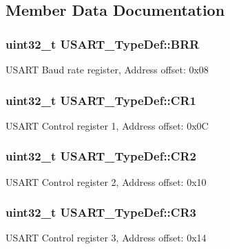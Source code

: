 \subsection{Member Data Documentation}
\subsubsection[{\texorpdfstring{B\+RR}{BRR}}]{ uint32\+\_\+t U\+S\+A\+R\+T\+\_\+\+Type\+Def\+::\+B\+RR}\hypertarget{struct_u_s_a_r_t___type_def_a6ef06ba9d8dc2dc2a0855766369fa7c9}{}\label{struct_u_s_a_r_t___type_def_a6ef06ba9d8dc2dc2a0855766369fa7c9}
U\+S\+A\+RT Baud rate register, Address offset\+: 0x08 
\subsubsection[{\texorpdfstring{C\+R1}{CR1}}]{ uint32\+\_\+t U\+S\+A\+R\+T\+\_\+\+Type\+Def\+::\+C\+R1}\hypertarget{struct_u_s_a_r_t___type_def_a6d7dcd3972a162627bc3470cbf992ec4}{}\label{struct_u_s_a_r_t___type_def_a6d7dcd3972a162627bc3470cbf992ec4}
U\+S\+A\+RT Control register 1, Address offset\+: 0x0C 
\subsubsection[{\texorpdfstring{C\+R2}{CR2}}]{ uint32\+\_\+t U\+S\+A\+R\+T\+\_\+\+Type\+Def\+::\+C\+R2}\hypertarget{struct_u_s_a_r_t___type_def_aa7ede2de6204c3fc4bd9fb328801c99a}{}\label{struct_u_s_a_r_t___type_def_aa7ede2de6204c3fc4bd9fb328801c99a}
U\+S\+A\+RT Control register 2, Address offset\+: 0x10 
\subsubsection[{\texorpdfstring{C\+R3}{CR3}}]{ uint32\+\_\+t U\+S\+A\+R\+T\+\_\+\+Type\+Def\+::\+C\+R3}\hypertarget{struct_u_s_a_r_t___type_def_af2991da9a4e1539530cd6b7b327199cc}{}\label{struct_u_s_a_r_t___type_def_af2991da9a4e1539530cd6b7b327199cc}
U\+S\+A\+RT Control register 3, Address offset\+: 0x14 
